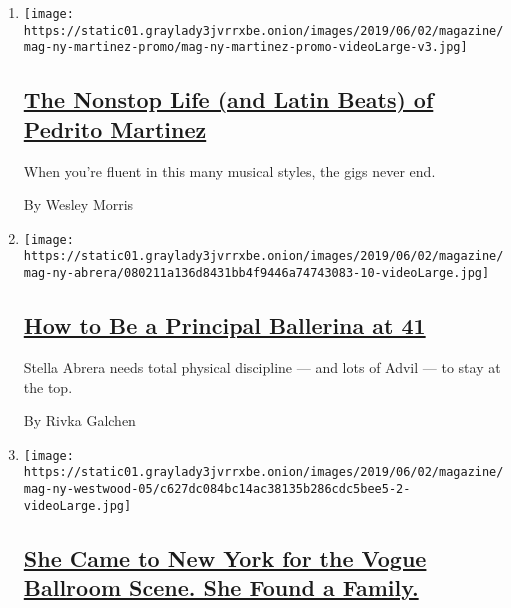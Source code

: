 \begin{enumerate}
\def\labelenumi{\arabic{enumi}.}
\item
  \texttt{[image: https://static01.graylady3jvrrxbe.onion/images/2019/06/02/magazine/mag-ny-martinez-promo/mag-ny-martinez-promo-videoLarge-v3.jpg]}

  \hypertarget{the-nonstop-life-and-latin-beats-of-pedrito-martinez}{%
  \subsection{\texorpdfstring{\href{/interactive/2019/05/30/magazine/latin-beat-new-york.html}{The
  Nonstop Life (and Latin Beats) of Pedrito
  Martinez}}{The Nonstop Life (and Latin Beats) of Pedrito Martinez}}\label{the-nonstop-life-and-latin-beats-of-pedrito-martinez}}

  When you're fluent in this many musical styles, the gigs never end.

  By Wesley Morris
\item
  \texttt{[image: https://static01.graylady3jvrrxbe.onion/images/2019/06/02/magazine/mag-ny-abrera/080211a136d8431bb4f9446a74743083-10-videoLarge.jpg]}

  \hypertarget{how-to-be-a-principal-ballerina-at-41}{%
  \subsection{\texorpdfstring{\href{/interactive/2019/05/30/magazine/dance-ballet-new-york.html}{How
  to Be a Principal Ballerina at
  41}}{How to Be a Principal Ballerina at 41}}\label{how-to-be-a-principal-ballerina-at-41}}

  Stella Abrera needs total physical discipline --- and lots of Advil
  --- to stay at the top.

  By Rivka Galchen
\item
  \texttt{[image: https://static01.graylady3jvrrxbe.onion/images/2019/06/02/magazine/mag-ny-westwood-05/c627dc084bc14ac38135b286cdc5bee5-2-videoLarge.jpg]}

  \hypertarget{she-came-to-new-york-for-the-vogue-ballroom-scene-she-found-a-family}{%
  \subsection{\texorpdfstring{\href{/interactive/2019/05/30/magazine/vogue-kiki-new-york.html}{She
  Came to New York for the Vogue Ballroom Scene. She Found a
  Family.}}{She Came to New York for the Vogue Ballroom Scene. She Found a Family.}}\label{she-came-to-new-york-for-the-vogue-ballroom-scene-she-found-a-family}}


\end{enumerate}
